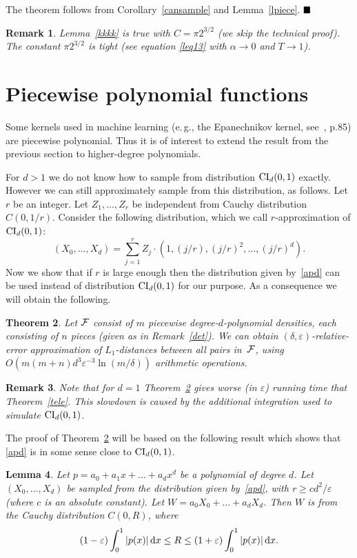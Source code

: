 \documentclass[11pt]{article}
\def\eps{\varepsilon}
\newtheorem{thm}{Theorem}[section]
\newtheorem{rem}[thm]{Remark}
\newtheorem{lem}[thm]{Lemma}
\newenvironment{prf}[1]{\noindent{\bf{Proof #1\\}}}{$\hfill\blacksquare$\nopagebreak[4]\vskip 0.3cm}
\def\BTHM{\begin{thm}}
\def\ETHM{\end{thm}}
\newcommand\BPRF[1][:]{\begin{prf}{#1}}
\def\EPRF{\end{prf}}
\def\BLEM{\begin{lem}}
\def\ELEM{\end{lem}}
\def\BREM{\begin{rem}\rm}
\def\EREM{\end{rem}}
\begin{document}
\BPRF[of Theorem~\ref{tele}:]
The theorem follows from Corollary~\ref{cansample} and Lemma~\ref{lpiece}.
\EPRF

\BREM
Lemma~\ref{kkkk} is true with $C=\pi 2^{3/2}$ (we skip the technical proof).
The constant $\pi 2^{3/2}$ is tight (see equation \eqref{leq13}
with $\alpha\rightarrow 0$ and $T\rightarrow 1$).
\EREM

\section{Piecewise polynomial functions}\label{z5}

Some kernels used in machine learning (e.\,g., the Epanechnikov kernel, see~\cite{DG01}, p.85)
are piecewise polynomial. Thus it is of interest to extend the result from the previous
section to higher-degree polynomials.

For $d>1$ we do not know how to sample from distribution ${\rm CI}_d(0,1)$ exactly. However we can still
approximately sample from this distribution, as follows. Let $r$ be an integer. Let $Z_1,\dots,Z_r$
be independent from Cauchy distribution $C(0,1/r)$. Consider the following distribution,
which we call $r$-approximation of ${\rm CI}_d(0,1)$:
\begin{equation}\label{apd}
(X_0,\dots,X_d)=\sum_{j=1}^r Z_j\cdot (1,(j/r),(j/r)^2,\dots,(j/r)^d).
\end{equation}
Now we show that if $r$ is large enough then the distribution given by~\eqref{apd} can be used instead of
distribution ${\rm CI}_d(0,1)$ for our purpose. As a consequence we will obtain the following.

\BTHM\label{trwe}
Let ${\cal F}$ consist of $m$ piecewise degree-$d$-polynomial densities, each consisting of $n$
pieces (given as in Remark~\ref{det}). We can obtain
$(\delta,\eps)$-relative-error approximation of $L_1$-distances between all
pairs in~${\cal F}$, using $O(m(m+n) d^3\eps^{-3}\ln(m/\delta))$ arithmetic operations.
\ETHM

\BREM
Note that for $d=1$ Theorem~\ref{trwe} gives worse (in $\eps$) running time that
Theorem~\ref{tele}. This slowdown is caused by the additional integration used to
simulate ${\rm CI}_d(0,1)$.
\EREM

The proof of Theorem~\ref{trwe} will be based on the following result which shows that
\eqref{apd} is in some sense close to ${\rm CI}_d(0,1)$.

\BLEM\label{lesa}
Let $p=a_0+a_1x+\dots+a_dx^d$ be a polynomial of degree $d$. Let $(X_0,\dots,X_d)$
be sampled from the distribution given by~\eqref{apd}, with $r\geq cd^2/\eps$ (where
$c$ is an absolute constant). Let
$W=a_0X_0+\dots+a_dX_d$. Then $W$ is from the Cauchy distribution $C(0,R)$, where
\begin{equation}\label{zwer}
(1-\eps)\int_{0}^1 |p(x)|\,{\rm d}x\leq R\leq (1+\eps)\int_{0}^1 |p(x)|\,{\rm d}x.
\end{equation}
\ELEM
\end{document}
